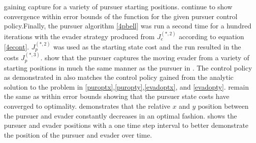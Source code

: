 gaining capture for a variety of pursuer starting positions.  continue to show convergence within error bounds of the function for the given pursuer control policy.Finally, the pursuer algorithm \ref{4pbell} was run a second time for a hundred iterations with the evader strategy produced from $J^{(*,2)}_e$ according to equation \ref{4econt}. $J^{(*,2)}_p$ was used as the starting state cost and the run resulted in the costs $J^{(*,3)}_p$.  show that the pursuer captures the moving evader from a variety of starting positions in much the same manner as the pursuer in . The control policy as demonstrated in  also matches the control policy gained from the analytic solution to the problem in \ref{puroptx},\ref{puropty},\ref{evadoptx}, and \ref{evadopty}.  remain the same as  within error bounds showing that the pursuer state costs have converged to optimality.  demonstrates that the relative $x$ and $y$ position between the pursuer and evader constantly decreases in an optimal fashion.  shows the pursuer and evader positions with a one time step interval to better demonstrate the position of the pursuer and evader over time.

